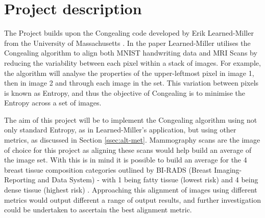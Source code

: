 \documentclass[11pt,fleqn,twoside]{article}
\begin{document}
\wordcount{}

\mmp

\setcounter{tocdepth}{3} %


\section{Project description}

The Project builds upon the Congealing code developed by Erik Learned-Miller from the University of Massachusetts \cite{joint-alignment}. In the paper Learned-Miller utilises the Congealing algorithm to align both MNIST handwriting data and MRI Scans by reducing the variability between each pixel within a stack of images. For example, the algorithm will analyse the properties of the upper-leftmost pixel in image 1, then in image 2 and through each image in the set. This variation between pixels is known as Entropy, and thus the objective of Congealing is to minimise the Entropy across a set of images. \par

The aim of this project will be to implement the Congealing algorithm using not only standard Entropy, as in Learned-Miller's application, but using other metrics, as discussed in Section \ref{ssec:alt-met}. Mammography scans are the image of choice for this project as aligning these scans would help build an average of the image set. With this is in mind it is possible to build an average for the 4 breast tissue composition categories outlined by BI-RADS (Breast Imaging-Reporting and Data System) - with 1 being fatty tissue (lowest risk) and 4 being dense tissue (highest risk) \cite{bi-rads}. Approaching this alignment of images using different metrics would output different a range of output results, and further investigation could be undertaken to ascertain the best alignment metric. \par
\end{document}
